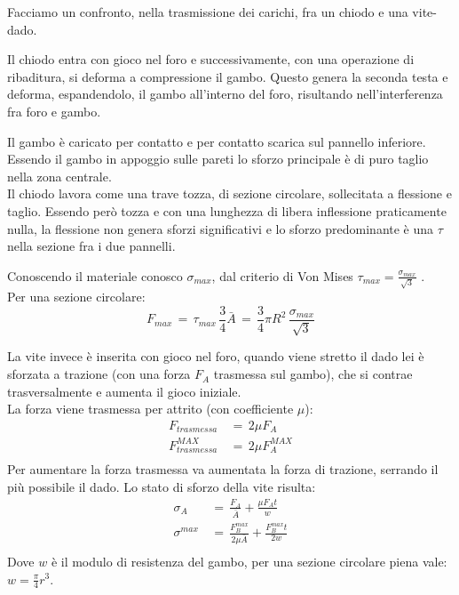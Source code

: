 \begin{esempioBox}
    Facciamo un confronto, nella trasmissione dei carichi, fra un chiodo e una vite-dado.

    Il chiodo entra con gioco nel foro e successivamente, con una operazione di ribaditura, si deforma a compressione il gambo. Questo genera la seconda testa e deforma, espandendolo, il gambo all'interno del foro, risultando nell'interferenza fra foro e gambo.

    Il gambo è caricato per contatto e per contatto scarica sul pannello inferiore. Essendo il gambo in appoggio sulle pareti lo sforzo principale è di puro taglio nella zona centrale. \\
    Il chiodo lavora come una trave tozza, di sezione circolare, sollecitata a flessione e taglio. Essendo però tozza e con una lunghezza di libera inflessione praticamente nulla, la flessione non genera sforzi significativi e lo sforzo predominante  è una $\tau$ nella sezione fra i due pannelli.

    Conoscendo il materiale conosco $\sigma_{max}$, dal criterio di Von Mises $\tau_{max}= \frac{\sigma_{max}}{\sqrt{3}}$ .\\
    Per una sezione circolare:
    \begin{equation*}
        F_{max} \,=\, \tau_{max}\,  \frac{3}{4}\bar{A}\,=\,  \frac{3}{4}\pi R^2\,\frac{\sigma_{max}}{\sqrt{3}}
    \end{equation*}

    La vite invece è inserita con gioco nel foro, quando viene stretto il dado lei è sforzata a trazione (con una forza $F_A$ trasmessa sul gambo), che si contrae trasversalmente e aumenta il gioco iniziale. \\
    La forza viene trasmessa per attrito (con coefficiente $\mu$):
    \begin{align*}
        F_{trasmessa}\,&=\, 2\mu F_A\\
         F_{trasmessa}^{MAX}\,&=\, 2\mu F_A^{MAX}\\
    \end{align*}
    Per aumentare la forza trasmessa va aumentata la forza di trazione, serrando il più possibile il dado.
    Lo stato di sforzo della vite risulta:
    \begin{align*}
        \sigma_A\,&=\,\frac{F_A}{\bar{A}} + \frac{\mu F_A t}{w}\\
         \sigma^{max}\,&=\,\frac{F^{max}_B}{2\mu\bar{A} } + \frac{F^{max}_B t}{2w}\\
    \end{align*}
    Dove $w$ è il modulo di resistenza del gambo, per una sezione circolare piena vale: $w=\frac{\pi}{4}r^3$.



\end{esempioBox}

